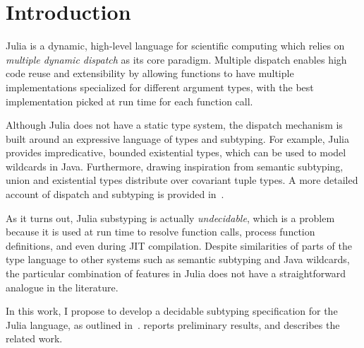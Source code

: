 \chapter{Introduction}

Julia is a dynamic, high-level language for scientific computing
which relies on \emph{multiple dynamic dispatch} as its core paradigm.
Multiple dispatch enables high code reuse and extensibility
by allowing functions to have multiple implementations specialized
for different argument types, with the best implementation picked at run time
for each function call.

Although Julia does not have a static type system,
the dispatch mechanism is built around an expressive language of types
and subtyping.
For example, Julia provides impredicative, bounded existential types,
which can be used to model wildcards in Java.
Furthermore, drawing inspiration from semantic subtyping,
union and existential types distribute over covariant tuple types.
A more detailed account of dispatch and subtyping is provided in~.

As it turns out, Julia substyping is actually \emph{undecidable},
which is a problem because it is used at run time to resolve function calls,
process function definitions, and even during JIT compilation.
Despite similarities of parts of the type language to other systems
such as semantic subtyping and Java wildcards, the particular combination
of features in Julia does not have a straightforward analogue in the literature.

In this work, I propose to develop a decidable subtyping specification for the
Julia language, as outlined in~.
 reports preliminary results,
and  describes the related work.



